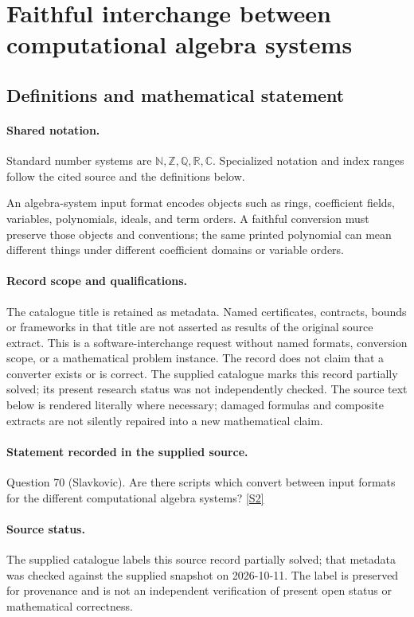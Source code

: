\documentclass[11pt]{article}
\newcommand{\sref}[2]{\hyperlink{source:#1:#2}{[S#2]}}
\begin{document}
\section{Faithful interchange between computational algebra systems}\label{statement}

\subsection{Definitions and mathematical statement}

\paragraph{Shared notation.}Standard number systems are $\mathbb N,\mathbb Z,\mathbb Q,\mathbb R,\mathbb C$. Specialized notation and index ranges follow the cited source and the definitions below.


An algebra-system input format encodes objects such as rings, coefficient fields, variables, polynomials, ideals, and term orders. A faithful conversion must preserve those objects and conventions; the same printed polynomial can mean different things under different coefficient domains or variable orders.
\paragraph{Record scope and qualifications.}
The catalogue title is retained as metadata. Named certificates, contracts, bounds or frameworks in that title are not asserted as results of the original source extract.
This is a software-interchange request without named formats, conversion scope, or a mathematical problem instance. The record does not claim that a converter exists or is correct. The supplied catalogue marks this record partially solved; its present research status was not independently checked.
The source text below is rendered literally where necessary; damaged formulas and composite extracts are not silently repaired into a new mathematical claim.
\paragraph{Statement recorded in the supplied source.}
Question 70 (Slavkovic). Are there scripts which convert between input formats for the different computational algebra systems? \sref{statement}{2}
\paragraph{Source status.}
The supplied catalogue labels this source record partially solved; that metadata was checked against the supplied snapshot on 2026-10-11. The label is preserved for provenance and is not an independent verification of present open status or mathematical correctness.
\end{document}
